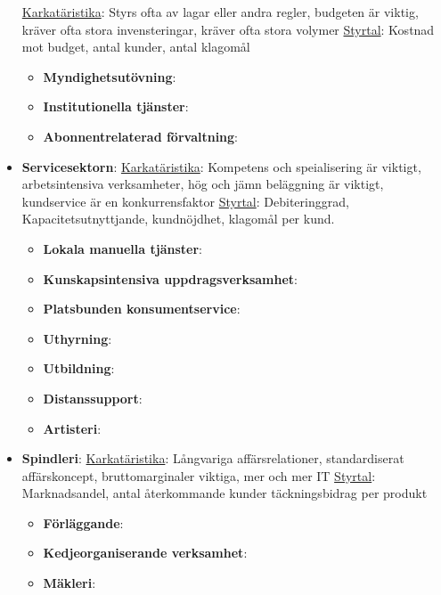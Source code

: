 \begin{itemize}
    \underline{Karkatäristika}:
    Styrs ofta av lagar eller andra regler, budgeten är viktig, kräver ofta stora invensteringar, kräver ofta stora volymer \newline
    \underline{Styrtal}:
    Kostnad mot budget, antal kunder, antal klagomål
    \begin{itemize}
        \item \textbf{Myndighetsutövning}:
        \item \textbf{Institutionella tjänster}:
        \item \textbf{Abonnentrelaterad förvaltning}:
    \end{itemize}
    \item \textbf{Servicesektorn}: \newline
    \underline{Karkatäristika}:
    Kompetens och speialisering är viktigt, arbetsintensiva verksamheter, hög och jämn beläggning är viktigt, kundservice är en konkurrensfaktor \newline
    \underline{Styrtal}:
    Debiteringgrad, Kapacitetsutnyttjande, kundnöjdhet, klagomål per kund.
    \begin{itemize}
        \item \textbf{Lokala manuella tjänster}:
        \item \textbf{Kunskapsintensiva uppdragsverksamhet}:
        \item \textbf{Platsbunden konsumentservice}:
        \item \textbf{Uthyrning}:
        \item \textbf{Utbildning}:
        \item \textbf{Distanssupport}:
        \item \textbf{Artisteri}:
    \end{itemize}
    \item \textbf{Spindleri}: \newline
    \underline{Karkatäristika}:
    Långvariga affärsrelationer, standardiserat affärskoncept, bruttomarginaler viktiga, mer och mer IT \newline
    \underline{Styrtal}:
    Marknadsandel, antal återkommande kunder täckningsbidrag per produkt
    \begin{itemize}
        \item \textbf{Förläggande}:
        \item \textbf{Kedjeorganiserande verksamhet}:
        \item \textbf{Mäkleri}:
    \end{itemize}
\end{itemize}

